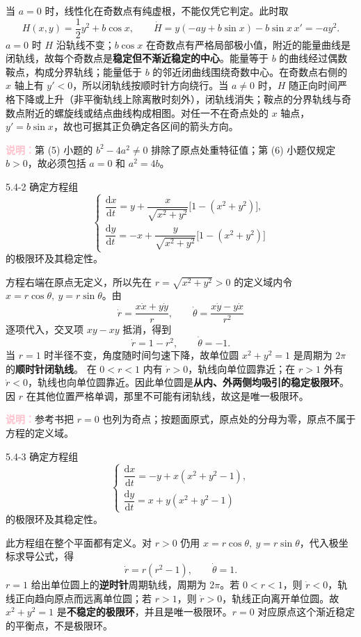 \documentclass[UTF8,a4paper,11pt]{ctexart}
\newcommand{\note}[1]{\par\smallskip\noindent\textcolor{pink}{\bfseries 说明：}#1\par\smallskip}
\begin{document}
\begin{solution}
\begin{enumerate}[label=(\arabic*)]
当 $a=0$ 时，线性化在奇数点有纯虚根，不能仅凭它判定。此时取
\[
H(x,y)=\frac12y^2+b\cos x,\qquad
\dot H=y(-ay+b\sin x)-b\sin x\,x'=-ay^2.
\]
$a=0$ 时 $H$ 沿轨线不变；$b\cos x$ 在奇数点有严格局部极小值，附近的能量曲线是闭轨线，故每个奇数点是\textbf{稳定但不渐近稳定的中心}。能量等于 $b$ 的曲线经过偶数鞍点，构成分界轨线；能量低于 $b$ 的邻近闭曲线围绕奇数中心。在奇数点右侧的 $x$ 轴上有 $y'<0$，所以闭轨线按顺时针方向绕行。当 $a\ne0$ 时，$H$ 随正向时间严格下降或上升（非平衡轨线上除离散时刻外），闭轨线消失；鞍点的分界轨线与奇数点附近的螺旋线或结点曲线构成相图。对任一不在奇点处的 $x$ 轴点，$y'=b\sin x$，故也可据其正负确定各区间的箭头方向。
\end{enumerate}
\note{第 (5) 小题的 $b^2-4a^2\ne0$ 排除了原点处重特征值；第 (6) 小题仅规定 $b>0$，故必须包括 $a=0$ 和 $a^2=4b$。}
\end{solution}

\begin{problem}{5.4-2}
确定方程组
\[
\begin{cases}
\dfrac{\mathrm dx}{\mathrm dt}
=y+\dfrac{x}{\sqrt{x^2+y^2}}\bigl[1-(x^2+y^2)\bigr],\\[7pt]
\dfrac{\mathrm dy}{\mathrm dt}
=-x+\dfrac{y}{\sqrt{x^2+y^2}}\bigl[1-(x^2+y^2)\bigr]
\end{cases}
\]
的极限环及其稳定性。
\end{problem}
\begin{solution}
方程右端在原点无定义，所以先在 $r=\sqrt{x^2+y^2}>0$ 的定义域内令
$x=r\cos\theta,\ y=r\sin\theta$。由
\[
\dot r=\frac{x\dot x+y\dot y}{r},\qquad
\dot\theta=\frac{x\dot y-y\dot x}{r^2}
\]
逐项代入，交叉项 $xy-xy$ 抵消，得到
\[
\boxed{\dot r=1-r^2,\qquad \dot\theta=-1.}
\]
当 $r=1$ 时半径不变，角度随时间匀速下降，故单位圆
$x^2+y^2=1$ 是周期为 $2\pi$ 的\textbf{顺时针闭轨线}。
在 $0<r<1$ 内有 $\dot r>0$，轨线向单位圆靠近；在 $r>1$ 外有 $\dot r<0$，轨线也向单位圆靠近。因此单位圆是\textbf{从内、外两侧均吸引的稳定极限环}。因 $r$ 在其他位置严格单调，那里不可能有闭轨线，故这是唯一极限环。
\note{参考书把 $r=0$ 也列为奇点；按题面原式，原点处的分母为零，原点不属于方程的定义域。}
\end{solution}

\begin{problem}{5.4-3}
确定方程组
\[
\begin{cases}
\dfrac{\mathrm dx}{\mathrm dt}=-y+x(x^2+y^2-1),\\[4pt]
\dfrac{\mathrm dy}{\mathrm dt}=x+y(x^2+y^2-1)
\end{cases}
\]
的极限环及其稳定性。
\end{problem}
\begin{solution}
此方程组在整个平面都有定义。对 $r>0$ 仍用
$x=r\cos\theta,\ y=r\sin\theta$，代入极坐标求导公式，得
\[
\boxed{\dot r=r(r^2-1),\qquad \dot\theta=1.}
\]
$r=1$ 给出单位圆上的\textbf{逆时针}周期轨线，周期为 $2\pi$。若 $0<r<1$，则 $\dot r<0$，轨线正向趋向原点而远离单位圆；若 $r>1$，则 $\dot r>0$，轨线正向离开单位圆。故 $x^2+y^2=1$ 是\textbf{不稳定的极限环}，并且是唯一极限环。$r=0$ 对应原点这个渐近稳定的平衡点，不是极限环。
\end{solution}
\end{document}
